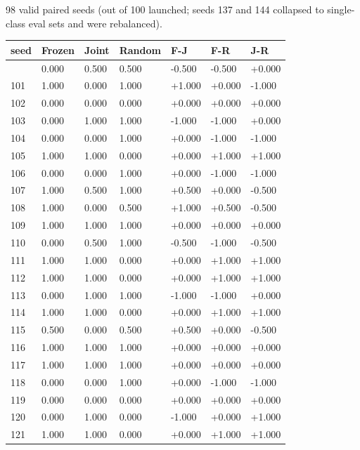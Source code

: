 \documentclass[
]{article}
\newcounter{none} %
\begin{document}
98 valid paired seeds (out of 100 launched; seeds 137 and 144 collapsed
to single-class eval sets and were rebalanced).

{\def\LTcaptype{none} %
\begin{longtable}[]{@{}lllllll@{}}
\toprule\noalign{}
seed & Frozen & Joint & Random & F-J & F-R & J-R \\
\midrule\noalign{}
\endhead
\bottomrule\noalign{}
\endlastfoot
100 & 0.000 & 0.500 & 0.500 & -0.500 & -0.500 & +0.000 \\
101 & 1.000 & 0.000 & 1.000 & +1.000 & +0.000 & -1.000 \\
102 & 0.000 & 0.000 & 0.000 & +0.000 & +0.000 & +0.000 \\
103 & 0.000 & 1.000 & 1.000 & -1.000 & -1.000 & +0.000 \\
104 & 0.000 & 0.000 & 1.000 & +0.000 & -1.000 & -1.000 \\
105 & 1.000 & 1.000 & 0.000 & +0.000 & +1.000 & +1.000 \\
106 & 0.000 & 0.000 & 1.000 & +0.000 & -1.000 & -1.000 \\
107 & 1.000 & 0.500 & 1.000 & +0.500 & +0.000 & -0.500 \\
108 & 1.000 & 0.000 & 0.500 & +1.000 & +0.500 & -0.500 \\
109 & 1.000 & 1.000 & 1.000 & +0.000 & +0.000 & +0.000 \\
110 & 0.000 & 0.500 & 1.000 & -0.500 & -1.000 & -0.500 \\
111 & 1.000 & 1.000 & 0.000 & +0.000 & +1.000 & +1.000 \\
112 & 1.000 & 1.000 & 0.000 & +0.000 & +1.000 & +1.000 \\
113 & 0.000 & 1.000 & 1.000 & -1.000 & -1.000 & +0.000 \\
114 & 1.000 & 1.000 & 0.000 & +0.000 & +1.000 & +1.000 \\
115 & 0.500 & 0.000 & 0.500 & +0.500 & +0.000 & -0.500 \\
116 & 1.000 & 1.000 & 1.000 & +0.000 & +0.000 & +0.000 \\
117 & 1.000 & 1.000 & 1.000 & +0.000 & +0.000 & +0.000 \\
118 & 0.000 & 0.000 & 1.000 & +0.000 & -1.000 & -1.000 \\
119 & 0.000 & 0.000 & 0.000 & +0.000 & +0.000 & +0.000 \\
120 & 0.000 & 1.000 & 0.000 & -1.000 & +0.000 & +1.000 \\
121 & 1.000 & 1.000 & 0.000 & +0.000 & +1.000 & +1.000 \\

\end{longtable}}
\end{document}
